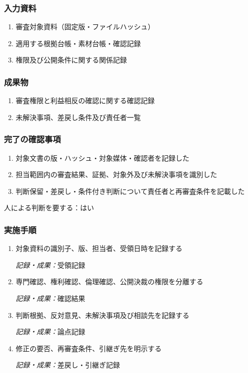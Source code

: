 \documentclass[a4paper,11pt]{article}
\begin{document}
\subsubsection*{入力資料}
\begin{enumerate}[leftmargin=2em,itemsep=0.35em]
\item 審査対象資料（固定版・ファイルハッシュ）
\item 適用する根拠台帳・素材台帳・確認記録
\item 権限及び公開条件に関する関係記録
\end{enumerate}
\subsubsection*{成果物}
\begin{enumerate}[leftmargin=2em,itemsep=0.35em]
\item 審査権限と利益相反の確認に関する確認記録
\item 未解決事項、差戻し条件及び責任者一覧
\end{enumerate}
\subsubsection*{完了の確認事項}
\begin{enumerate}[leftmargin=2em,itemsep=0.35em]
\item 対象文書の版・ハッシュ・対象媒体・確認者を記録した
\item 担当範囲内の審査結果、証拠、対象外及び未解決事項を識別した
\item 判断保留・差戻し・条件付き判断について責任者と再審査条件を記載した
\end{enumerate}
\par 人による判断を要する：はい\par\medskip
\subsubsection*{実施手順}
\begin{enumerate}[leftmargin=2em,itemsep=0.65em]
\item 対象資料の識別子、版、担当者、受領日時を記録する\par\noindent\textit{記録・成果：}受領記録\nobreak\smallskip
\item 専門確認、権利確認、倫理確認、公開決裁の権限を分離する\par\noindent\textit{記録・成果：}確認結果\nobreak\smallskip
\item 判断根拠、反対意見、未解決事項及び相談先を記録する\par\noindent\textit{記録・成果：}論点記録\nobreak\smallskip
\item 修正の要否、再審査条件、引継ぎ先を明示する\par\noindent\textit{記録・成果：}差戻し・引継ぎ記録\nobreak\smallskip
\end{enumerate}
\end{document}
